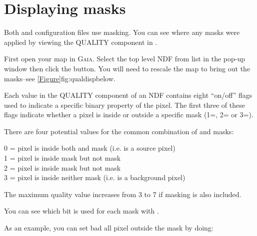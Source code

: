 \section{Displaying masks}
\label{sec:maskshow}

Both  and
 configuration files use
masking. You can see where any masks were applied by viewing the
QUALITY component in \gaia.

First open your map in \textsc{Gaia}. Select the top level NDF from
list in the pop-up window then click the 
button. You will need to rescale the map to bring out the masks--see
\cref{Figure}{fig:qualdisp}{below}.



Each value in the QUALITY component of an NDF contains eight ``on/off''
flags used to indicate a specific binary property of the pixel. The
first three of these flags indicate whether a pixel is inside or outside a
specific mask (1=, 2= or 3=).

There are four potential values for the common combination of
 and  masks:

0 = pixel is inside both  and  mask (i.e. is a source pixel)\\
1 = pixel is inside  mask but not  mask\\
2 = pixel is inside  mask but not  mask\\
3 = pixel is inside neither mask (i.e. is a background pixel)


The maximum quality value increases from 3 to 7 if  masking
is also included.

You can see which bit is used for each mask with \showqual.
\begin{terminalv}
\end{terminalv}

As an example, you can set bad all pixel outside the  mask
by doing:
\begin{terminalv}
\end{terminalv}


